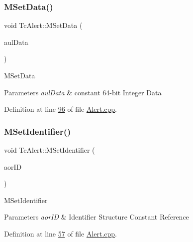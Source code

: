 \subsubsection{\texorpdfstring{M\+Set\+Data()}{MSetData()}}
{\footnotesize\ttfamily void Tc\+Alert\+::\+M\+Set\+Data (\begin{DoxyParamCaption}\item[{const \mbox{\hyperlink{namespace_g_n_common_a9404ee6090c788ae70aebd1436ceb97d}{Tu64}}}]{aul\+Data }\end{DoxyParamCaption})}

M\+Set\+Data 
\begin{DoxyParams}{Parameters}
{\em aul\+Data} & constant 64-\/bit Integer Data \\
\hline
\end{DoxyParams}


Definition at line \mbox{\hyperlink{_alert_8cpp_source_l00096}{96}} of file \mbox{\hyperlink{_alert_8cpp_source}{Alert.\+cpp}}.

\mbox{\label{class_g_n_common_1_1_n_notification_1_1_tc_alert_a5411a5d9659282e199ceb16a1b88c17d}} 
\subsubsection{\texorpdfstring{M\+Set\+Identifier()}{MSetIdentifier()}}
{\footnotesize\ttfamily void Tc\+Alert\+::\+M\+Set\+Identifier (\begin{DoxyParamCaption}\item[{const \mbox{\hyperlink{class_g_n_common_1_1_n_notification_1_1_tc_identifier}{Tc\+Identifier}} \&}]{aor\+ID }\end{DoxyParamCaption})}

M\+Set\+Identifier 
\begin{DoxyParams}{Parameters}
{\em aor\+ID} & Identifier Structure Constant Reference \\
\hline
\end{DoxyParams}


Definition at line \mbox{\hyperlink{_alert_8cpp_source_l00057}{57}} of file \mbox{\hyperlink{_alert_8cpp_source}{Alert.\+cpp}}.

